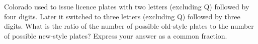 Colorado used to issue licence plates with two letters (excluding Q) followed by four digits. Later it switched to three letters (excluding Q) followed by three digits. What is the ratio of the number of possible old-style plates to the number of possible new-style plates? Express your answer as a common fraction.
